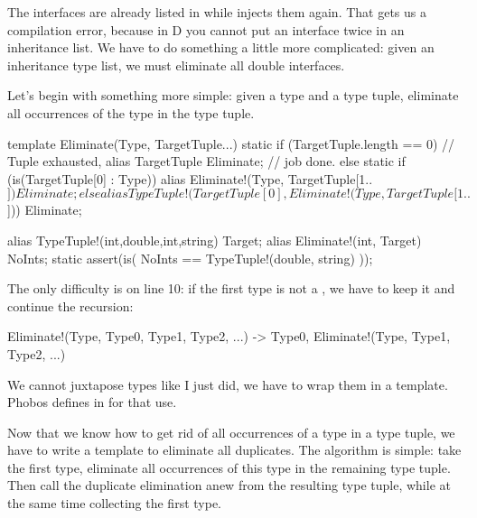 The interfaces are already listed in  while  injects them again. That gets us a compilation error, because in D you cannot put an interface twice in an inheritance list. We have to do something a little more complicated: given an inheritance type list, we must eliminate all double interfaces.

Let's begin with something more simple: given a type and a type tuple, eliminate all occurrences of the type in the type tuple.

\begin{ndcode}
template Eliminate(Type, TargetTuple...)
{
    static if (TargetTuple.length == 0) // Tuple exhausted,
        alias TargetTuple 
              Eliminate;    // job done.
    else static if (is(TargetTuple[0] : Type))
        alias Eliminate!(Type, TargetTuple[1..$]) 
              Eliminate;
    else
        alias TypeTuple!(TargetTuple[0], Eliminate!(Type, TargetTuple[1..$])) 
              Eliminate;
}

alias TypeTuple!(int,double,int,string) Target;
alias Eliminate!(int, Target) NoInts;
static assert(is( NoInts == TypeTuple!(double, string) ));
\end{ndcode}

The only difficulty is on line 10: if the first type is not a , we have to keep it and continue the recursion:

\begin{dcode}
Eliminate!(Type,  Type0, Type1, Type2, ...)
->
Type0, Eliminate!(Type,  Type1, Type2, ...)
\end{dcode}

We cannot juxtapose types like I just did, we have to wrap them in a template. Phobos defines  in  for that use.

Now that we know how to get rid of all occurrences of a type in a type tuple, we have to write a template to eliminate all duplicates. The algorithm is simple: take the first type, eliminate all occurrences of this type in the remaining type tuple. Then call the duplicate elimination anew from the resulting type tuple, while at the same time collecting the first type.


